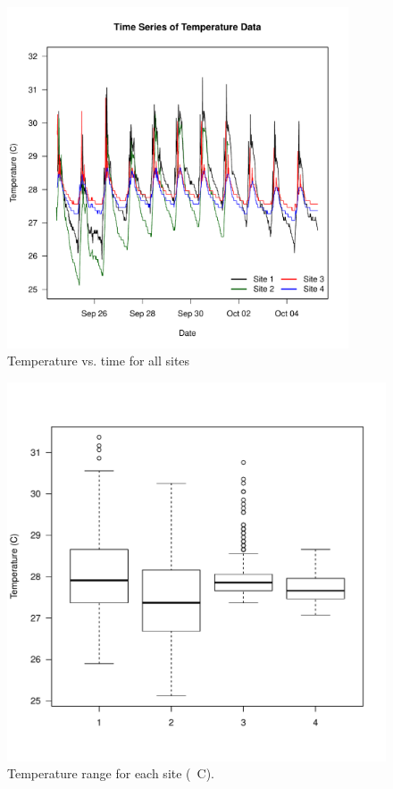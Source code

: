 \documentclass{article}\usepackage[]{graphicx}\usepackage[]{color}
\makeatletter
\def\maxwidth{ %
  \ifdim\Gin@nat@width>\linewidth
    \linewidth
  \else
    \Gin@nat@width
  \fi
}
\newenvironment{knitrout}{}{} %
\makeatother
\begin{document}
\begin{figure}[!ht]
\includegraphics[width=0.90\textwidth]{Figures/Temp}
\caption{Temperature vs. time for all sites}
\label{fig:Temp}
\end{figure}


\begin{figure}
\begin{knitrout}
\color{fgcolor}
\includegraphics[width=\maxwidth]{figure/unnamed-chunk-4-1} 

\end{knitrout}
\label{fig:tempbox}
\caption{Temperature range for each site (\textdegree~C).}
\end{figure}
\end{document}
